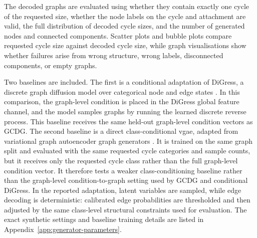 The decoded graphs are evaluated using whether they contain exactly one cycle
of the requested size, whether the node labels on the cycle and attachment are
valid, the full distribution of decoded cycle sizes, and the number of generated
nodes and connected components. Scatter plots and bubble plots compare requested
cycle size against decoded cycle size, while graph visualisations show whether
failures arise from wrong structure, wrong labels, disconnected components, or
empty graphs.

Two baselines are included. The first is a conditional adaptation of DiGress,
a discrete graph diffusion model over categorical node and edge states
\citep{vignac2022digress}. In this comparison, the graph-level condition is
placed in the DiGress global feature channel, and the model samples graphs by
running the learned discrete reverse process. This baseline receives the same
held-out graph-level condition vectors as GCDG. The second
baseline is a direct class-conditional \gls{vgae}, adapted from variational graph
autoencoder graph generators \citep{kipf2016vgae,simonovsky2018graphvae}.
It is trained on the same graph split and evaluated with the same requested
cycle categories and sample counts, but it receives only the requested cycle
class rather than the full graph-level condition vector. It therefore tests a
weaker class-conditioning baseline rather than the graph-level condition-to-graph
setting used by GCDG and conditional DiGress. In the reported
adaptation, latent variables are sampled, while edge decoding is deterministic:
calibrated edge probabilities are thresholded and then adjusted by the same
class-level structural constraints used for evaluation. The exact synthetic
settings and baseline training details are listed in
Appendix~\ref{app:generator-parameters}.

